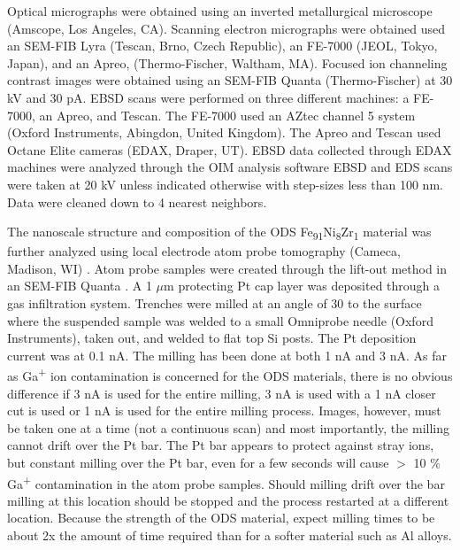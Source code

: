 		Optical micrographs were obtained using an inverted metallurgical microscope (Amscope, Los Angeles, CA). Scanning electron micrographs were obtained used an SEM-FIB Lyra (Tescan, Brno, Czech Republic), an FE-7000 (JEOL, Tokyo, Japan), and an Apreo, (Thermo-Fischer, Waltham, MA). Focused ion channeling contrast images were obtained using an SEM-FIB Quanta (Thermo-Fischer) at 30 kV and 30 pA. EBSD scans were performed on three different machines: a FE-7000, an Apreo, and Tescan. The FE-7000 used an AZtec channel 5 system (Oxford Instruments, Abingdon, United Kingdom). The Apreo and Tescan used Octane Elite cameras (EDAX, Draper, UT). EBSD data collected through EDAX machines were analyzed through the OIM analysis software EBSD and EDS scans were taken at 20 kV unless indicated otherwise with step-sizes less than 100 nm. Data were cleaned down to 4 nearest neighbors.
		
		
		The nanoscale structure and composition of the ODS Fe\textsubscript{91}Ni\textsubscript{8}Zr\textsubscript{1} material was further analyzed using local electrode atom probe tomography (Cameca, Madison, WI) \cite{RN704}. Atom probe samples were created through the lift-out method in an SEM-FIB Quanta \cite{RN347}. A 1 $\mu$m protecting Pt cap layer was deposited through a gas infiltration system. Trenches were milled at an angle of 30 \celsius{}  to the surface where the suspended sample was welded to a small Omniprobe needle (Oxford Instruments), taken out, and welded to flat top Si posts. The Pt deposition current was at 0.1 nA. The milling has been done at both 1 nA and 3 nA. As far as Ga\textsuperscript{+} ion contamination is concerned for the ODS materials, there is no obvious difference if 3 nA is used for the entire milling, 3 nA is used with a 1 nA closer cut is used or 1 nA is used for the entire milling process. Images, however, must be taken one at a time (not a continuous scan) and most importantly, the milling cannot drift over the Pt bar. The Pt bar appears to protect against stray ions, but constant milling over the Pt bar, even for a few seconds will cause $>$ 10 $\%$  Ga\textsuperscript{+} contamination in the atom probe samples. Should milling drift over the bar milling at this location should be stopped and the process restarted at a different location. Because the strength of the ODS material, expect milling times to be about 2x the amount of time required than for a softer material such as Al alloys. 
		
		
		
